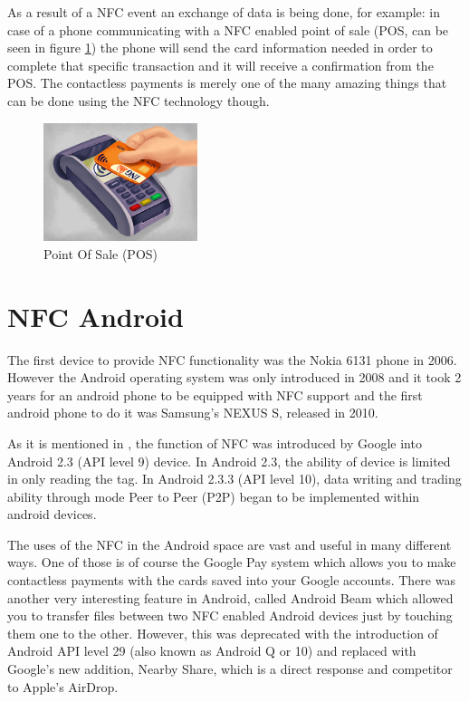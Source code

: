 As a result of a NFC event an exchange of data is being done, for example: in case of a phone communicating with a NFC enabled point of sale (POS, can be seen in figure \ref{fig:pos}) the phone will send the card information needed in order to complete that specific transaction and it will receive a confirmation from the POS. The contactless payments is merely one of the many amazing things that can be done using the NFC technology though.

\begin{figure}
\centering
\includegraphics[width=0.4\textwidth]{figures/pos.jpg}
\caption{Point Of Sale (POS) \cite{posImage}}
\label{fig:pos}
\end{figure}

\section{NFC Android}
\label{sec:ch2sec2}

\par The first device to provide NFC functionality was the Nokia 6131 phone in 2006. However the Android operating system was only introduced in 2008 and it took 2 years for an android phone to be equipped with NFC support and the first android phone to do it was Samsung's NEXUS S, released in 2010.

As it is mentioned in \cite{nasution2012prototype}, the function of NFC was introduced by Google into Android 2.3 (API level 9) device. In Android 2.3, the ability of device is limited in only reading the tag. In Android 2.3.3 (API level 10), data writing and trading ability through mode Peer to Peer (P2P) began to be implemented within android devices. 

The uses of the NFC in the Android space are vast and useful in many different ways. One of those is of course the Google Pay system which allows you to make contactless payments with the cards saved into your Google accounts. There was another very interesting feature in Android, called Android Beam which allowed you to transfer files between two NFC enabled Android devices just by touching them one to the other. However, this was deprecated with the introduction of Android API level 29 (also known as Android Q or 10) and replaced with Google's new addition, Nearby Share, which is a direct response and competitor to Apple's AirDrop.

